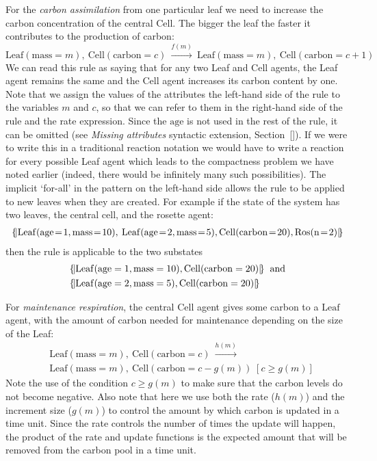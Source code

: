 For the \textit{carbon assimilation} from one particular leaf we need to
increase the carbon concentration of the central Cell. The bigger the leaf the
faster it contributes to the production of carbon:
\[\mathrm{Leaf}(\mathrm{mass}=m), \: \mathrm{Cell}(\mathrm{carbon}=c) \:
\xrightarrow{f(m)} \: \mathrm{Leaf}(\mathrm{mass}=m), \:
\mathrm{Cell}(\mathrm{carbon}=c+1)\]
We can read this rule as saying that for
any two Leaf and Cell agents, the Leaf agent remains the same and the Cell agent
increases its carbon content by one. Note that we assign the values of the
attributes 
the left-hand side of the rule to the variables $m$ and $c$, so that we can
refer to them in the right-hand side of the rule and the rate expression. Since
the $\mathrm{age}$ is not used in the rest of the rule, it can be omitted (see
\textit{Missing attributes} syntactic extension, Section~\ref{}). If
we were to write this in a traditional reaction notation we would have to write
a reaction for every possible Leaf agent which leads to the compactness problem
we have noted earlier (indeed, there would be infinitely many such
possibilities). The implicit `for-all' in the pattern on the left-hand side
allows the rule to be applied to new leaves when they are
created. For example if the state of the system has two leaves, the central
cell, and the rosette agent:
\begin{align*}
\m{ \mathrm{Leaf}(\ar{age}{1}, \ar{mass}{10}), \:
\mathrm{Leaf}(\ar{age}{2}, \ar{mass}{5}),
\mathrm{Cell}(\ar{carbon}{20}), \mr{Ros}(\ar{n}{2})}
\end{align*}
then the rule is applicable to the two substates
\begin{align*}
& \{\!| \mathrm{Leaf}(\mathrm{age}=1, \mathrm{mass}=10),
                 \mathrm{Cell}(\mathrm{carbon}=20) |\!\} \: \text{ and} \\
&\{\!| \mathrm{Leaf}(\mathrm{age}=2,
  \mathrm{mass}=5), \mathrm{Cell}(\mathrm{carbon}=20) |\!\}
\end{align*}

For \textit{maintenance respiration}, the central $\mathrm{Cell}$ agent gives
some carbon to a $\mathrm{Leaf}$ agent, with the amount of carbon needed for
maintenance depending on the size of the Leaf:
%
\begin{align*}
&\mathrm{Leaf}(\mathrm{mass}=m),\: \mathrm{Cell}(\mathrm{carbon}=c) \:
\xrightarrow{h(m)} \\ &\mathrm{Leaf}(\mathrm{mass}=m),\:
\mathrm{Cell}(\mathrm{carbon}=c-g(m)) \; [c \geq g(m)]
\end{align*}
Note the use of the condition $c \geq g(m)$ to make sure that the
carbon levels do not become negative. Also note that here we use both the rate
($h(m)$) and the increment size ($g(m)$) to control the amount by which carbon
is updated in a time unit. Since the rate controls the number of times the
update will happen, the product of the rate and update functions is the expected
amount that will be removed from the carbon pool in a time unit.

